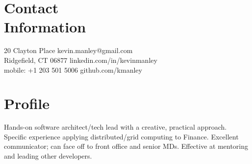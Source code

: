 \documentclass[margin,line]{resume}
\begin{document}
\begin{resume}

    \section{\mysidestyle Contact\\Information}

    20 Clayton Place			                            \hfill kevin.manley@gmail.com       \vspace{0mm}\\\vspace{0mm}%
    Ridgefield, CT 06877                                    \hfill linkedin.com/in/kevinmanley        \vspace{0mm}\\\vspace{0mm}%
    mobile: +1 203 501 5006 					\hfill github.com/kmanley  \vspace{0mm}\\\vspace{-4.5mm}%


    \section{\mysidestyle Profile}

    Hands-on software architect/tech lead with a creative, practical approach. Specific experience applying distributed/grid computing
    to Finance. Excellent communicator; can face off to front office and senior MDs. Effective at mentoring and leading other developers.



\end{resume}
\end{document}
